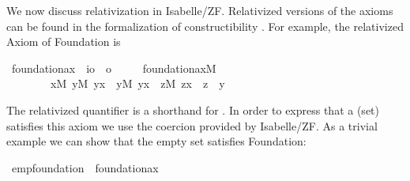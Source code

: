 
We now discuss relativization in Isabelle/ZF. Relativized versions of the
 axioms can be found in the formalization of constructibility \cite{paulson_2003}. For
 example, the relativized Axiom of Foundation is
\begin{isabelle}
\isamarkupfalse%
\ foundation{\isacharunderscore}ax\ {\isacharcolon}{\isacharcolon}\ {\isachardoublequoteopen}{\isacharparenleft}i{\isacharequal}{\isachargreater}o{\isacharparenright}\ {\isacharequal}{\isachargreater}\ o{\isachardoublequoteclose}\ \isanewline
\ \ \ \ {\isachardoublequoteopen}foundation{\isacharunderscore}ax{\isacharparenleft}M{\isacharparenright}\ {\isacharequal}{\isacharequal}\isanewline
\ \ \ \ \ \ \ \ {\isasymforall}x{\isacharbrackleft}M{\isacharbrackright}{\isachardot}\ {\isacharparenleft}{\isasymexists}y{\isacharbrackleft}M{\isacharbrackright}{\isachardot}\ y{\isasymin}x{\isacharparenright}\ {\isasymlongrightarrow}\ {\isacharparenleft}{\isasymexists}y{\isacharbrackleft}M{\isacharbrackright}{\isachardot}\ y{\isasymin}x\ {\isacharampersand}\ {\isachartilde}{\isacharparenleft}{\isasymexists}z{\isacharbrackleft}M{\isacharbrackright}{\isachardot}\ z{\isasymin}x\ {\isacharampersand}\ z\ {\isasymin}\ y{\isacharparenright}{\isacharparenright}{\isachardoublequoteclose}
\end{isabelle}

\noindent The relativized quantifier
 is a shorthand for \isa{{\isasymforall}x{\isachardot}\ M(x)
  {\isasymlongrightarrow} P(x)}. In order to express that a (set)
satisfies this axiom we use  the coercion
 provided by Isabelle/ZF. As a trivial example we
can show that the empty set satisfies Foundation:
\begin{isabelle}
\isamarkupfalse%
\ emp{\isacharunderscore}foundation\ {\isacharcolon}\ {\isachardoublequoteopen}foundation{\isacharunderscore}ax{\isacharparenleft}{\isacharhash}{\isacharhash}{}{\isacharparenright}{\isachardoublequoteclose}
\end{isabelle}



